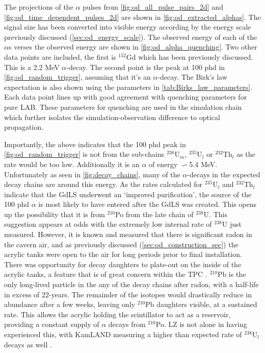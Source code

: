 \par
The projections of the $\alpha$ pulses from \autoref{fig:od_all_pulse_pairs_2d} and \autoref{fig:od_time_dependent_pulses_2d} are shown in \autoref{fig:od_extracted_alphas}.
The signal size has been converted into visible energy according by the energy scale previously discussed (\autoref{sec:od_energy_scale}).
The observed energy of each of the $\alpha$s verses the observed energy are shown in \autoref{fig:od_alpha_quenching}.
Two other data points are included, the first is ${}^{152}$Gd which has been previously discussed.
This is a 2.2 MeV $\alpha$-decay.
The second point is the peak at 100 phd in \autoref{fig:od_random_trigger}, assuming that it's an $\alpha$-decay.
The Birk's law expectation is also shown using the parameters in \autoref{tab:Birks_law_parameters}.
Each data point lines up with good agreement with quenching parameters for pure LAB.
These parameters for quenching are used in the simulation chain which further isolates the simulation-observation difference to optical propagation.
\par
Importantly, the above indicates that the 100 phd peak in \autoref{fig:od_random_trigger} is not from the sub-chains ${}^{238}$U$_{m}$, ${}^{235}$U$_{l}$ or ${}^{232}$Th$_{l}$ as the rate would be too low.
Additionally it is an $\alpha$ of energy $\backsim$5.4 MeV.
Unfortunately as seen in \autoref{fig:decay_chains}, many of the $\alpha$-decays in the expected decay chains are around this energy.
As the rates calculated for ${}^{235}$U$_{l}$ and ${}^{232}$Th$_{l}$ indicate that the GdLS underwent an `improved purification', the source of the 100 phd $\alpha$ is most likely to have entered after the GdLS was created.
This opens up the possibility that it is from ${}^{210}$Po from the late chain of ${}^{238}$U. 
This suggestion appears at odds with the extremely low internal rate of ${}^{238}$U just measured.
However, it is known and measured that there is significant radon in the cavern air, and as previously discussed (\autoref{sec:od_construction_sec}) the acrylic tanks were open to the air for long periods prior to final installation.
There was opportunity for decay daughters to plate-out on the inside of the acrylic tanks, a feature that is of great concern within the TPC \cite{radon_plateout_ref}.
${}^{210}$Pb is the only long-lived particle in the any of the decay chains after radon, with a half-life in excess of 22-years. 
The remainder of the isotopes would drastically reduce in abundance after a few weeks, leaving only ${}^{210}$Pb daughters visible, at a sustained rate.
This allows the acrylic holding the scintillator to act as a reservoir, providing a constant supply of $\alpha$ decays from ${}^{210}$Po.
LZ is not alone in having experienced this, with KamLAND measuring a higher than expected rate of ${}^{238}$U$_l$ decays as well \cite{KamLAND_LS_contaminants_ref}.

